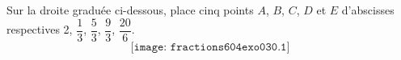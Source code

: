 Sur la droite graduée ci-dessous, place cinq points $A$, $B$, $C$, $D$
et $E$ d'abscisses respectives 2, $\dfrac13$, $\dfrac53$, $\dfrac93$,
$\dfrac{20}6$.
\[\texttt{[image: fractions604exo030.1]}\]